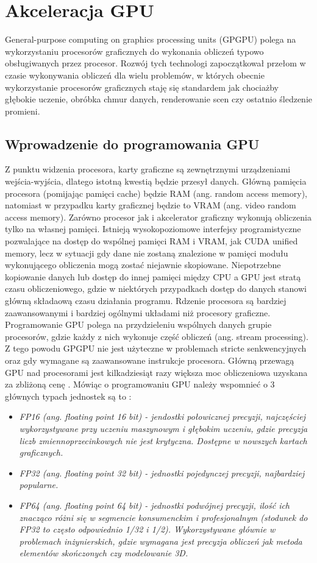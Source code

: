 \section{Akceleracja GPU}
\label{sec:akceleracja}
General-purpose computing on graphics processing units (GPGPU) polega na wykorzystaniu procesorów graficznych do wykonania obliczeń typowo obsługiwanych przez procesor. Rozwój tych technologi zapoczątkował przełom w czasie wykonywania obliczeń dla wielu problemów, w których obecnie wykorzystanie procesorów graficznych staję się standardem jak chociażby głębokie uczenie, obróbka chmur danych, renderowanie scen czy ostatnio śledzenie promieni.

\subsection{Wprowadzenie do programowania GPU}
Z punktu widzenia procesora, karty graficzne są zewnętrznymi urządzeniami wejścia-wyjścia, dlatego istotną kwestią będzie przesył danych. Główną pamięcia procesora (pomijając pamięci cache) będzie RAM (ang. random access memory), natomiast w przypadku karty graficznej będzie to VRAM (ang. video random access memory). Zarówno procesor jak i akcelerator graficzny wykonują obliczenia tylko na własnej pamięci. Istnieją wysokopoziomowe interfejsy programistyczne pozwalające na dostęp do wspólnej pamięci RAM i VRAM, jak CUDA unified memory, lecz w sytuacji gdy dane nie zostaną znalezione w pamięci modułu wykonującego obliczenia mogą zostać niejawnie skopiowane. Niepotrzebne kopiowanie danych lub dostęp do innej pamięci między CPU a GPU jest stratą czasu obliczeniowego, gdzie w niektórych przypadkach dostęp do danych stanowi główną składaową czasu działania programu. Rdzenie procesora są bardziej zaawansowanymi i bardziej ogólnymi układami niż procesory graficzne. Programowanie GPU polega na przydzieleniu wspólnych danych grupie procesorów, gdzie każdy z nich wykonuje część obliczeń (ang. stream processing). Z tego powodu GPGPU nie jest użyteczne w problemach stricte senkwencyjnych oraz gdy wymagane są zaawansowane instrukcje procesora. Główną przewagą GPU nad procesorami jest kilkadziesiąt razy większa moc obliczeniowa uzyskana za zbliżoną cenę \cite{GpuSpec} \cite{CpuSpec}. Mówiąc o programowaniu GPU należy wspomnieć o 3 głównych typach jednostek są to :
\begin{itemize}
	\item \it{FP16} (ang. floating point 16 bit) - jendostki połowicznej precyzji, najczęściej wykorzystywane przy uczeniu maszynowym i głębokim uczeniu, gdzie precyzja liczb zmiennoprzecinkowych nie jest krytyczna. Dostępne w nowszych kartach graficznych.
	\item \it{FP32} (ang. floating point 32 bit) - jednostki pojedynczej precyzji, najbardziej popularne.
	\item \it{FP64} (ang. floating point 64 bit) - jednostki podwójnej precyzji, ilość ich znacząco różni się w segmencie konsumenckim i profesjonalnym (stodunek do FP32 to często odpowiednio 1/32 i 1/2). Wykorzystywane głównie w problemach inżynierskich, gdzie wymagana jest precyzja obliczeń jak metoda elementów skończonych czy modelowanie 3D.
\end{itemize}
